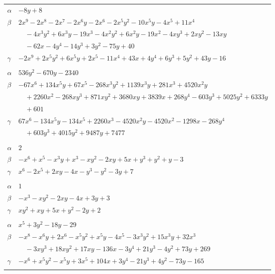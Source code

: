 \documentclass[11pt]{article}
\begin{document}
\begin{longtable}{@{}ll@{}}
$\alpha$ & $-8y+8$\\
$\beta$ & $2x^{9}-2x^{8}-2x^{7}-2x^{6}y-2x^{6}-2x^{5}y^{2}-10x^{5}y-4x^{5}+11x^{4}$\\
 & $\quad -4x^{3}y^{2}+6x^{3}y-19x^{3}-4x^{2}y^{2}+6x^{2}y-19x^{2}-4xy^{3}+2xy^{2}-13xy$\\
 & $\quad -62x-4y^{4}-14y^{3}+3y^{2}-75y+40$\\
$\gamma$ & $-2x^{9}+2x^{5}y^{2}+6x^{5}y+2x^{5}-11x^{4}+43x+4y^{4}+6y^{3}+5y^{2}+43y-16$\\
\addlinespace[3pt]
\multicolumn{2}{@{}l}{$\{i,j\}=\{25,33\}$, $k_{ij}=2^{3}\cdot 3^{4}\cdot 7$}\\
$\alpha$ & $536y^{2}-670y-2340$\\
$\beta$ & $-67x^{6}+134x^{5}y+67x^{5}-268x^{3}y^{2}+1139x^{3}y+281x^{3}+4520x^{2}y$\\
 & $\quad +2260x^{2}-268xy^{3}+871xy^{2}+3680xy+3839x+268y^{4}-603y^{3}+5025y^{2}+6333y$\\
 & $\quad +601$\\
$\gamma$ & $67x^{6}-134x^{5}y-134x^{5}+2260x^{3}-4520x^{2}y-4520x^{2}-1298x-268y^{4}$\\
 & $\quad +603y^{3}+4015y^{2}+9487y+7477$\\
\addlinespace[3pt]
\multicolumn{2}{@{}l}{$\{i,j\}=\{25,39\}$, $k_{ij}=2^{2}\cdot 3$}\\
$\alpha$ & $2$\\
$\beta$ & $-x^{6}+x^{5}-x^{3}y+x^{3}-xy^{2}-2xy+5x+y^{3}+y^{2}+y-3$\\
$\gamma$ & $x^{6}-2x^{5}+2xy-4x-y^{3}-y^{2}-3y+7$\\
\addlinespace[3pt]
\multicolumn{2}{@{}l}{$\{i,j\}=\{26,36\}$, $k_{ij}=2\cdot 3$}\\
$\alpha$ & $1$\\
$\beta$ & $-x^{3}-xy^{2}-2xy-4x+3y+3$\\
$\gamma$ & $xy^{2}+xy+5x+y^{2}-2y+2$\\
\addlinespace[3pt]
\multicolumn{2}{@{}l}{$\{i,j\}=\{26,40\}$, $k_{ij}=2^{4}\cdot 3\cdot 5$}\\
$\alpha$ & $x^{5}+3y^{2}-18y-29$\\
$\beta$ & $-x^{8}-x^{6}y+2x^{6}-x^{5}y^{2}+x^{5}y-4x^{5}-3x^{3}y^{2}+15x^{3}y+32x^{3}$\\
 & $\quad -3xy^{3}+18xy^{2}+17xy-136x-3y^{4}+21y^{3}-4y^{2}+73y+269$\\
$\gamma$ & $-x^{6}+x^{5}y^{2}-x^{5}y+3x^{5}+104x+3y^{4}-21y^{3}+4y^{2}-73y-165$\\
\addlinespace[3pt]
\multicolumn{2}{@{}l}{$\{i,j\}=\{27,33\}$, $k_{ij}=3\cdot 17$}\\

\end{longtable}
\end{document}
